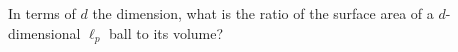 In terms of $d$ the dimension, what is the ratio of the surface area of a $d$-dimensional $\ell_p$ ball to its volume?
